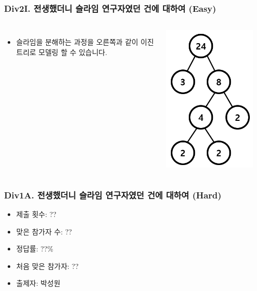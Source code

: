 \documentclass[xetex]{beamer}
\begin{document}
\begin{frame}
  \frametitle{Div2I. 전생했더니 슬라임 연구자였던 건에 대하여 (Easy)}
  \begin{columns}
      \begin{itemize}
        \item 슬라임을 분해하는 과정을 오른쪽과 같이 이진트리로 모델링 할 수 있습니다.
      \end{itemize}
      \includegraphics[width=0.9\textwidth]{slime-sol-0.png}
  \end{columns}
\end{frame}

\begin{frame}
  \frametitle{Div1A. 전생했더니 슬라임 연구자였던 건에 대하여 (Hard)}
  \begin{itemize}
    \item 제출 횟수: ??
    \item 맞은 참가자 수: ??
    \item 정답률: ??\%
    \item 처음 맞은 참가자: ??
    \item 출제자: 박성원
  \end{itemize}
\end{frame}
\end{document}
